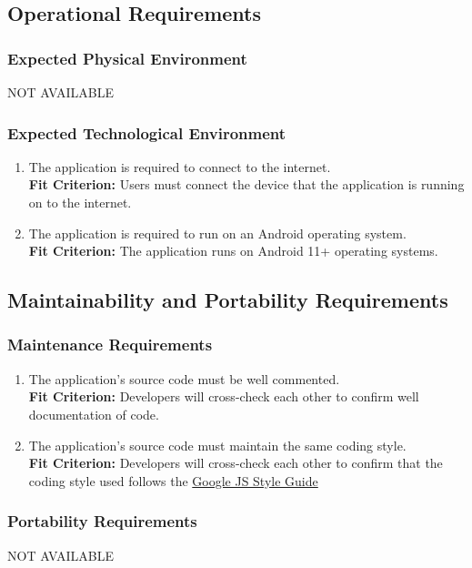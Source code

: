 \documentclass[12pt,letterpaper]{article}
\begin{document}
\subsection{Operational Requirements}
\subsubsection{Expected Physical Environment}
NOT AVAILABLE
\subsubsection{Expected Technological Environment}
\begin{enumerate}[{OE}1.] 
	\item The application is required to connect to the internet.\\
	{\textbf{Fit Criterion:} Users must connect the device that the application is running on to the internet.}
	\item The application is required to run on an Android operating system.\\
	{\textbf{Fit Criterion:} The application runs on Android 11+ operating systems.}
\end{enumerate}
\subsection{Maintainability and Portability Requirements}
\subsubsection{Maintenance Requirements}
\begin{enumerate}[{MP}1.] 
	\item The application's source code must be well commented. \\
	{\textbf{Fit Criterion:} Developers will cross-check each other to confirm well documentation of code. }
	\item The application's source code must maintain the same coding style. \\
	{\textbf{Fit Criterion:} Developers will cross-check each other to confirm that the coding style used follows the \href{https://google.github.io/styleguide/jsguide.html}{\color{blue}Google JS Style Guide}}
\end{enumerate}

\subsubsection{Portability Requirements}
NOT AVAILABLE
\end{document}
